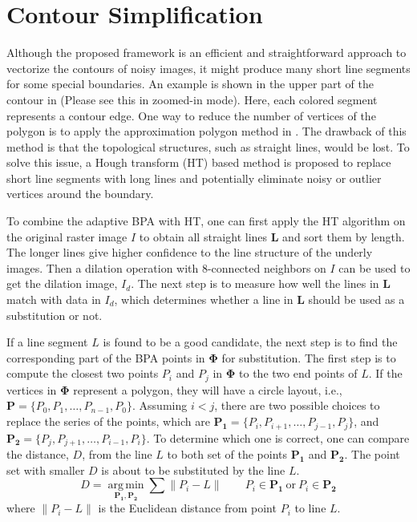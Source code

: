 \section{Contour Simplification}
\label{sec:BPA_HT}

Although the proposed framework is an efficient and straightforward approach to
vectorize the contours of noisy images,
it might produce many short line segments for some special boundaries. 
An example is shown in the upper part of the contour in  
(Please see this in zoomed-in mode). 
Here, each colored segment represents a contour edge.
One way to reduce the number of vertices of the polygon is to apply
the approximation polygon method in \cite{DP_AV}. 
The drawback of this method is that the topological structures, 
such as straight lines, would be lost.
To solve this issue, a Hough transform (HT) based method is proposed to replace
short line segments with long lines and potentially eliminate noisy
or outlier vertices around the boundary.

To combine the adaptive BPA with HT, 
one can first apply the HT algorithm on the original raster image $I$ 
to obtain all straight lines $\boldsymbol{L}$ and sort them by length.
The longer lines give higher confidence to the line structure of the underly images.
Then a dilation operation with 8-connected neighbors on $I$ 
can be used to get the dilation image, $I_d$.
The next step is to measure how well the lines in $\boldsymbol{L}$ match with
data in $I_d$, which determines whether a line in $\boldsymbol{L}$
should be used as a substitution or not.

If a line segment $L$ is found to be a good candidate, the next step is to
find the corresponding part of the BPA points in $\boldsymbol{\Phi}$ for
substitution. The first step is to compute the closest two points
$P_i$ and $P_j$ in $\boldsymbol{\Phi}$ to the two end points of $L$.
If the vertices in $\boldsymbol{\Phi}$ represent a polygon, they will have
a circle layout, i.e., $\boldsymbol{P} = \{ P_0,P_1,\ldots ,P_{n-1}, P_0 \}$.
Assuming $i < j$, there are two possible choices to replace
the series of the points, which are
$\boldsymbol{P_1} = \{ P_i,P_{i+1},\ldots,P_{j-1}, P_j \}$, and
$\boldsymbol{P_2} = \{ P_j,P_{j+1},\ldots,P_{i-1}, P_i \}$.
To determine which one is correct, one can compare the distance, $D$,
from the line $L$ to both set of the points $\boldsymbol{P_1}$ and
$\boldsymbol{P_2}$.
The point set with smaller $D$ is about to be substituted by the line $L$.
\begin{equation*}
D = \underset{\boldsymbol{P_1},\boldsymbol{P_2}}{\operatorname{arg\,min}}\sum{\lVert P_i - L \rVert}
\qquad P_i \in \boldsymbol{P_1} \ \text{or} \ P_i \in \boldsymbol{P_2}
\end{equation*}
where $\lVert P_i - L \rVert$ is the Euclidean distance from point $P_i$ to
line $L$.

